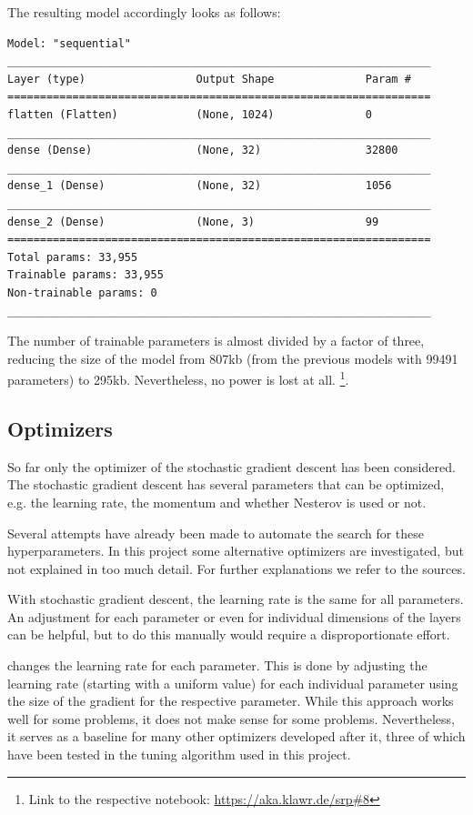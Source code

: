 The resulting model accordingly looks as follows:

\begin{lstlisting}
Model: "sequential"
_________________________________________________________________
Layer (type)                 Output Shape              Param #   
=================================================================
flatten (Flatten)            (None, 1024)              0         
_________________________________________________________________
dense (Dense)                (None, 32)                32800     
_________________________________________________________________
dense_1 (Dense)              (None, 32)                1056      
_________________________________________________________________
dense_2 (Dense)              (None, 3)                 99        
=================================================================
Total params: 33,955
Trainable params: 33,955
Non-trainable params: 0
_________________________________________________________________
\end{lstlisting}

The number of trainable parameters is almost divided by a factor of three, reducing the size of the model from 807kb (from the previous models with 99491 parameters) to 295kb.
Nevertheless, no power is lost at all. \footnote{Link to the respective notebook: \url{https://aka.klawr.de/srp\#8}}.

\subsection{Optimizers}

So far only the optimizer of the stochastic gradient descent has been considered.
The stochastic gradient descent has several parameters that can be optimized, e.g. the learning rate, the momentum and whether Nesterov is used or not.

Several attempts have already been made to automate the search for these hyperparameters.
In this project some alternative optimizers are investigated, but not explained in too much detail.
For further explanations we refer to the sources.

With stochastic gradient descent, the learning rate is the same for all parameters.
An adjustment for each parameter or even for individual dimensions of the layers can be helpful, but to do this manually would require a disproportionate effort.

 \cite{Duchi2010} changes the learning rate for each parameter.
This is done by adjusting the learning rate (starting with a uniform value) for each individual parameter using the size of the gradient for the respective parameter.
While this approach works well for some problems, it does not make sense for some problems.
Nevertheless, it serves as a baseline for many other optimizers developed after it, three of which have been tested in the tuning algorithm used in this project.

